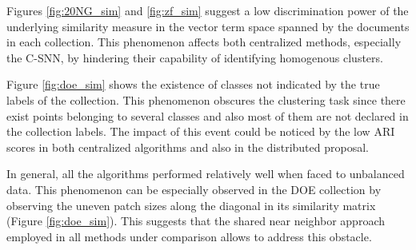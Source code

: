 \documentclass[a4paper]{article}
\begin{document}
Figures \ref{fig:20NG_sim} and \ref{fig:zf_sim} suggest a low discrimination power of the underlying similarity measure in the vector term space spanned by the documents in each collection. This phenomenon affects both centralized methods, especially the C-SNN, by hindering their capability of identifying homogenous clusters.

Figure \ref{fig:doe_sim} shows the existence of classes not indicated by the true labels of the collection. This phenomenon obscures the clustering task since there exist points belonging to several classes and also most of them are not declared in the collection labels. The impact of this event could be noticed by the low ARI scores in both centralized algorithms and also in the distributed proposal.

In general, all the algorithms performed relatively well when faced to unbalanced data. This phenomenon can be especially observed in the DOE collection by observing the uneven patch sizes along the diagonal in its similarity matrix (Figure \ref{fig:doe_sim}). This suggests that the shared near neighbor approach employed in all methods under comparison allows to address this obstacle.




\end{document}
